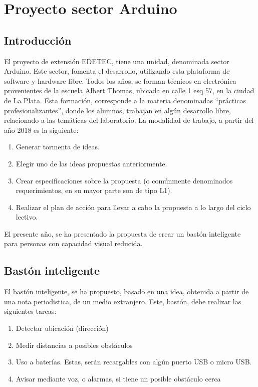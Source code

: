 \chapter*{Proyecto sector Arduino} 
%
\addtocounter{ns}{1} 
\section{Introducción}

El proyecto de extensión EDETEC, tiene una unidad, denominada sector Arduino. Este sector, fomenta el desarrollo, utilizando esta plataforma de software y hardware libre. Todos los años, se forman técnicos en electrónica provenientes de la escuela Albert Thomas, ubicada en calle 1 esq 57, en la ciudad de La Plata. Esta formación, corresponde a la materia denominadas ``prácticas profesionalizantes'', donde los alumnos, trabajan en algún desarrollo libre, relacionado a las temáticas del laboratorio. La modalidad de trabajo, a partir del año 2018 es la siguiente: 
\begin{enumerate}
	\item Generar tormenta de ideas.
	\item Elegir uno de las ideas propuestas anteriormente.
	\item Crear especificaciones sobre la propuesta (o comúnmente denominados requerimientos, en su mayor parte son de tipo L1).
	\item Realizar el plan de acción para llevar a cabo la propuesta a lo largo del ciclo lectivo.
\end{enumerate}

El presente año, se ha presentado la propuesta de crear un bastón inteligente para personas con capacidad visual reducida. 

\section{Bastón inteligente}

El bastón inteligente, se ha propuesto, basado en una idea, obtenida a partir de una nota periodistica, de un medio extranjero. Este, bastón, debe realizar las siguientes tareas: 
\begin{enumerate}
	\item Detectar ubicación (dirección)  
	\item Medir distancias a posibles obstáculos
	\item Uso a baterías. Estas, serán recargables con algún puerto USB o micro USB. 
	\item Avisar mediante voz, o alarmas, si tiene un posible obstáculo cerca
\end{enumerate}

